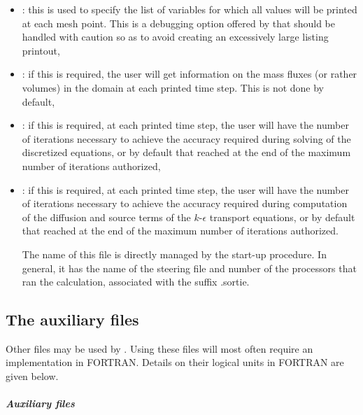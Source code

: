 \begin{itemize}
\item {}:
this is used to specify the list of variables for which all values
will be printed at each mesh point.
This is a debugging option offered by  that should be handled
with caution so as to avoid creating an excessively large listing printout,

\item {}:
if this is required, the user will get information on the mass fluxes
(or rather volumes) in the domain at each printed time step.
This is not done by default,

\item {}:
if this is required, at each printed time step, the user will have the number
of iterations necessary to achieve the accuracy required during
solving of the discretized equations, or by default that reached at the end
of the maximum number of iterations authorized,

\item {}:
if this is required, at each printed time step, the user will have
the number of iterations necessary to achieve the accuracy required
during computation of the diffusion and source terms of the $k$-$\epsilon$
transport equations,
or by default that reached at the end of the maximum number of iterations
authorized.

The name of this file is directly managed by the  start-up procedure.
In general, it has the name of the steering file and number of the processors
that ran the calculation, associated with the suffix .sortie.

\end{itemize}

\subsection{The auxiliary files}

Other files may be used by .
Using these files will most often require an implementation in FORTRAN.
Details on their logical units in FORTRAN are given below.

\subparagraph{Auxiliary files}

